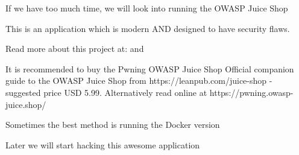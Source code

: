 \documentclass[Screen16to9,17pt]{foils}
\begin{document}

\begin{list1}
\item If we have too much time, we will look into running the OWASP Juice Shop
\item This is an application which is modern AND designed to have security flaws.
\item Read more about this project at:
 and 
\item It is recommended to buy the Pwning OWASP Juice Shop Official companion guide to the OWASP Juice Shop from https://leanpub.com/juice-shop - suggested price USD 5.99. Alternatively read online at https://pwning.owasp-juice.shop/
\item Sometimes the best method is running the Docker version
\end{list1}

\vskip 1cm
\centerline{\large Later we will start hacking this awesome application}

\slidenext{}
\end{document}
